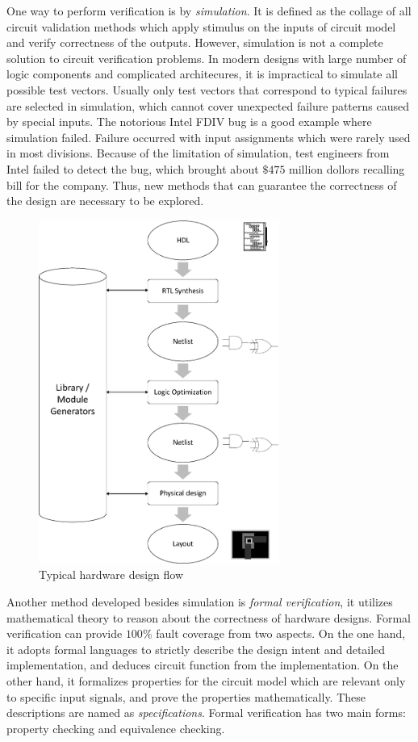 One way to perform verification is by {\it simulation}. It is defined as the collage of all circuit validation 
methods which apply stimulus on the inputs of circuit model and verify correctness of the outputs.
However, simulation is not a complete solution to circuit verification problems. In modern designs with 
large number of logic components and complicated architecures, it is impractical to simulate all possible 
test vectors. Usually only test vectors that correspond to typical failures are selected in simulation, which 
cannot cover unexpected failure patterns caused by special inputs. The notorious Intel FDIV bug \cite{nicely:FDIV}
is a good example where simulation failed. Failure occurred with input assignments which were rarely used in most divisions. Because of the limitation of simulation,  
test engineers from Intel failed to detect the bug,  which brought about $\$475$ million dollors recalling bill
for the company. Thus,  new methods that can guarantee the correctness of the design are necessary to be explored.

{
\begin{figure}[h]
\centerline{
\includegraphics[width=0.7\textwidth]{newfig/designflow.eps}
}
\caption{Typical hardware design flow}
\label{fig:designflow}
\end{figure}
}

Another method developed besides simulation is \emph{formal verification}, it utilizes 
mathematical theory to reason about the correctness of hardware designs.
Formal verification can provide $100\%$ fault coverage from two aspects. On the one hand,  
it adopts formal languages to strictly describe the design intent and detailed implementation, 
and deduces circuit function from the implementation.
On the other hand,  it formalizes properties
for the circuit model which are relevant only to specific input signals,  and prove the properties mathematically. 
These descriptions are named as {\it specifications}.
Formal verification has two main forms: property checking and equivalence 
checking. 

